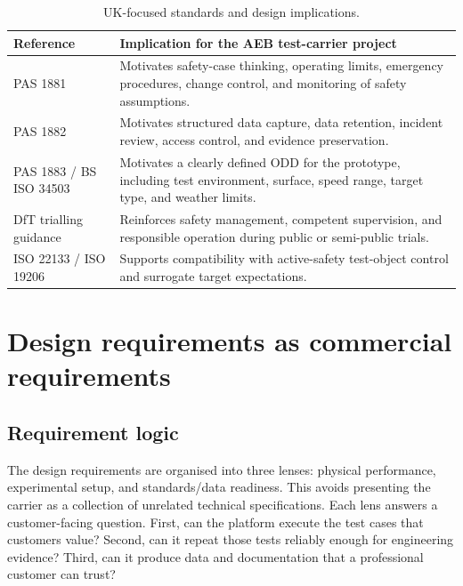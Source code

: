 \begin{table}[H]
\centering
\caption{UK-focused standards and design implications.}
\label{tab:standards_design_compact}
\begin{tabular}{p{} p{}}
\toprule
\textbf{Reference} & \textbf{Implication for the AEB test-carrier project} \\
\midrule
PAS 1881 & Motivates safety-case thinking, operating limits, emergency procedures, change control, and monitoring of safety assumptions. \\
PAS 1882 & Motivates structured data capture, data retention, incident review, access control, and evidence preservation. \\
PAS 1883 / BS ISO 34503 & Motivates a clearly defined ODD for the prototype, including test environment, surface, speed range, target type, and weather limits. \\
DfT trialling guidance & Reinforces safety management, competent supervision, and responsible operation during public or semi-public trials. \\
ISO 22133 / ISO 19206 & Supports compatibility with active-safety test-object control and surrogate target expectations. \\
\bottomrule
\end{tabular}
\end{table}

\section{Design requirements as commercial requirements}

\subsection{Requirement logic}

The design requirements are organised into three lenses: physical performance, experimental setup, and standards/data readiness. This avoids presenting the carrier as a collection of unrelated technical specifications. Each lens answers a customer-facing question. First, can the platform execute the test cases that customers value? Second, can it repeat those tests reliably enough for engineering evidence? Third, can it produce data and documentation that a professional customer can trust?


